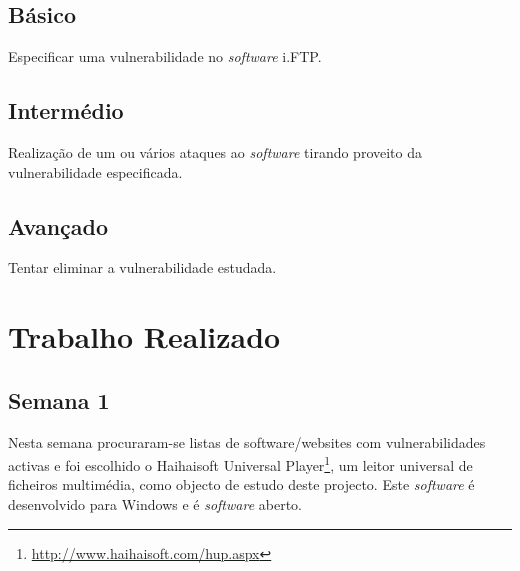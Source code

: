\documentclass[11pt,a4paper]{article}
\begin{document}
\subsection*{Básico}
Especificar uma vulnerabilidade no \textit{software} i.FTP.
\subsection*{Intermédio}
Realização de um ou vários ataques ao \textit{software} tirando proveito da vulnerabilidade especificada.
\subsection*{Avançado}
Tentar eliminar a vulnerabilidade estudada.

\section{Trabalho Realizado}
\subsection{Semana 1}


Nesta semana procuraram-se listas de software/websites com vulnerabilidades activas e foi escolhido o Haihaisoft Universal Player\footnote{\url{http://www.haihaisoft.com/hup.aspx}}, um leitor universal de ficheiros multimédia, como objecto de estudo deste projecto. Este \textit{software} é desenvolvido para Windows e é \textit{software} aberto.
\end{document}
